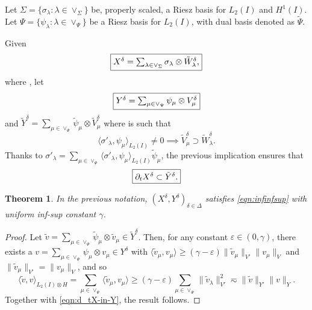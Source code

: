 \documentclass[11pt,a4paper,oneside,english]{amsart}
\numberwithin{equation}{section}
\newtheorem{theorem}{Theorem}
\numberwithin{theorem}{section}
\theoremstyle{definition}
\newcommand{\eps}{\varepsilon}
\newcommand{\la}{\langle}
\newcommand{\ra}{\rangle}
\newcommand{\jw}[1]{{\color{red}{JW: #1}}}
\newcommand{\rvv}[1]{{\color{teal}{RvV: #1}}}
\begin{document}
Let $\Sigma=\{\sigma_\lambda : \lambda \in \vee_\Sigma\}$ be, properly scaled, a Riesz basis for $L_2(I)$ and $H^1(I)$.\rvv{Definitie maken ergens?}
Let $\Psi=\{\psi_\lambda \colon \lambda \in \vee_\Psi\}$ be a Riesz basis for $L_2(I)$, with dual basis denoted as $\tilde{\Psi}$.

Given
\[
\framebox{$X^\delta=\sum_{\lambda \in \vee_\Sigma} \sigma_\lambda \otimes \tilde{W}_\lambda^\delta,$}
\]
where , let
\[
\framebox{$Y^\delta=\sum_{\mu \in \vee_\Psi} \psi_\mu \otimes V_\mu^\delta$}
\]
and $\tilde{Y}^\delta=\sum_{\mu \in \vee_\Psi} \tilde{\psi}_\mu \otimes \tilde{V}_\mu^\delta$ 
where  is such that 
\begin{equation}
  \label{eqn:pre-doubletree}
  \la \sigma'_\lambda,\psi_\mu\ra_{L_2(I)} \neq 0 \implies \tilde{V}^\delta_\mu \supset \tilde{W}^\delta_\lambda.
\end{equation}
\jw{hoe werkt deze eis precies?}
Thanks to $\sigma'_\lambda=\sum_{\mu \in \vee_\Psi} \la \sigma'_\lambda,\psi_\mu\ra_{L_2(I)}\tilde{\psi}_\mu$, the previous implication ensures that
\begin{equation}
  \label{eqn:d_tX-in-Y}
 \framebox{$\partial_t X^\delta \subset \tilde{Y}^\delta.$}
\end{equation}
\rvv{deze uitlijning is slecht}
\begin{theorem}
In the previous notation, $(X^\delta,Y^\delta)_{\delta \in \Delta}$ satisfies
  \eqref{eqn:infinfsup} with uniform inf-sup constant $\gamma$.
\end{theorem}
\begin{proof}
  \jw{Ik ben dit nog niet nagegaan.}
Let $\tilde v=\sum_{\mu \in \vee_\Psi} \tilde{\psi}_\mu \otimes \tilde{v}_\mu \in \tilde{Y}^\delta$.
Then, for any constant $\eps\in (0,\gamma)$, there exists a $v=\sum_{\mu \in \vee_\Psi} \psi_\mu \otimes v_\mu \in Y^\delta$  with $\la \tilde v_\mu,v_\mu\ra \geq (\gamma-\eps) \|\tilde{v}_\mu\|_{V'} \|v_\mu\|_V$ and $\|\tilde{v}_\mu\|_{V'}= \|v_\mu\|_V$, and so
\[
  \la\tilde v, v\ra_{L_2(I)\otimes H}
  = \sum_{\mu \in \vee_\Psi} \la \tilde{v}_\mu,v_\mu\ra \geq (\gamma-\eps) 
  \sum_{\mu \in \vee_\Psi} \|\tilde{v}_\lambda\|_{V'}^2
  \eqsim \|\tilde v\|_{Y'} \|v\|_Y.
\]
  Together with \eqref{eqn:d_tX-in-Y}, the result follows.
\end{proof}
\end{document}
